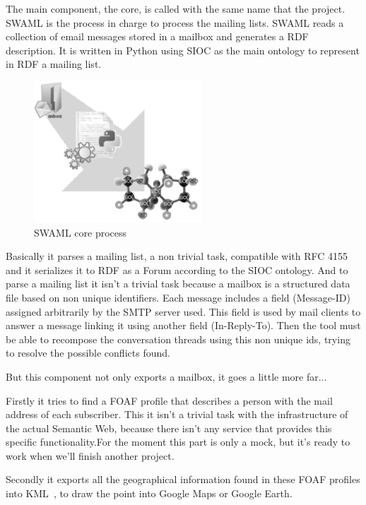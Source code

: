\documentclass{llncs}
\begin{document}
The main component, the core, is called with the same name that the project. 
SWAML is the process in charge to process the mailing lists. SWAML reads a 
collection of email messages stored in a mailbox and generates a RDF 
description. It is written in Python using SIOC as the main ontology to 
represent in RDF a mailing list.

\begin{figure}[ht]
 \centering
 \includegraphics[bb=0 0 238 200]{images/swaml-process.png}
 \caption{SWAML core process}
\end{figure}

Basically it parses a mailing list, a non trivial task, compatible with 
RFC 4155~\cite{RFC4155} and it serializes it to RDF as a Forum according 
to the SIOC ontology. And to parse a mailing list it isn't a trivial task 
because a mailbox is a structured data file based on non unique identifiers.
Each message includes a field (\textsf{Message-ID}) assigned arbitrarily by 
the SMTP server used. This field is used by mail clients to answer a message
linking it using another field (\textsf{In-Reply-To}). Then the tool must be 
able to recompose the conversation threads using this non unique ids,
trying to resolve the possible conflicts found.

But this component not only exports a mailbox, it goes a little more far...

Firstly it tries to find a FOAF profile that describes a person with the 
mail address of each subscriber. This it isn't a trivial task with the 
infrastructure of the actual Semantic Web, because there isn't any service 
that provides this specific functionality.For the moment this part is only 
a mock, but it's ready to work when we'll finish another project.

Secondly it exports all the geographical information found in these FOAF 
profiles into KML~\cite{Ricket2006}, to draw the point into Google Maps or 
Google Earth.
\end{document}
